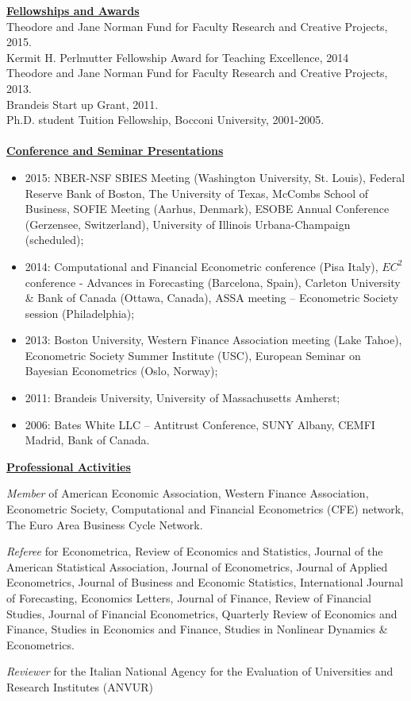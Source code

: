 \documentclass[12pt]{article}
\begin{document}
\underline{\textbf{Fellowships and Awards}}\\
Theodore and Jane Norman Fund for Faculty Research and Creative Projects, 2015. \\
Kermit H. Perlmutter Fellowship Award for Teaching Excellence, 2014 \\
Theodore and Jane Norman Fund for Faculty Research and Creative Projects, 2013. \\
Brandeis Start up Grant, 2011. \\
Ph.D. student Tuition Fellowship, Bocconi University, 2001-2005.\\ \\
\underline{\textbf{Conference and Seminar Presentations}}
\begin{itemize}
  \item 2015: NBER-NSF SBIES Meeting (Washington University, St. Louis), Federal Reserve Bank of Boston, The University of Texas, McCombs School of Business, SOFIE Meeting (Aarhus, Denmark), ESOBE Annual Conference (Gerzensee, Switzerland), University of Illinois Urbana-Champaign (scheduled);
	\item 2014: Computational and Financial Econometric conference (Pisa Italy), $EC^2$ conference - Advances in Forecasting (Barcelona, Spain),  Carleton University & Bank of Canada (Ottawa, Canada), ASSA meeting -- Econometric Society session (Philadelphia);  
	\item 2013: Boston University, Western Finance Association meeting (Lake Tahoe), Econometric Society Summer Institute (USC), European Seminar on Bayesian Econometrics (Oslo, Norway); 
	\item 2011: Brandeis University, University of Massachusetts Amherst; 
	\item 2006: Bates White LLC -- Antitrust Conference, SUNY Albany, CEMFI Madrid, Bank of Canada.
\end{itemize}

\underline{\textbf{Professional Activities}}
\begin{description}
\item\emph{Member} of American Economic Association, Western Finance Association, Econometric Society, Computational and Financial Econometrics (CFE) network, The Euro Area Business Cycle Network.

\item \emph{Referee} for Econometrica, Review of Economics and Statistics, Journal of the American Statistical Association, Journal of Econometrics, Journal of Applied Econometrics, Journal of Business and Economic Statistics, International Journal of Forecasting, Economics Letters, Journal of Finance, Review of Financial Studies, Journal of Financial Econometrics, Quarterly Review of Economics and Finance, Studies in Economics and Finance, Studies in Nonlinear Dynamics & Econometrics.

\item \emph{Reviewer} for the Italian National Agency for the Evaluation of Universities and Research Institutes (ANVUR) 
\end{description}
 
\end{document}
